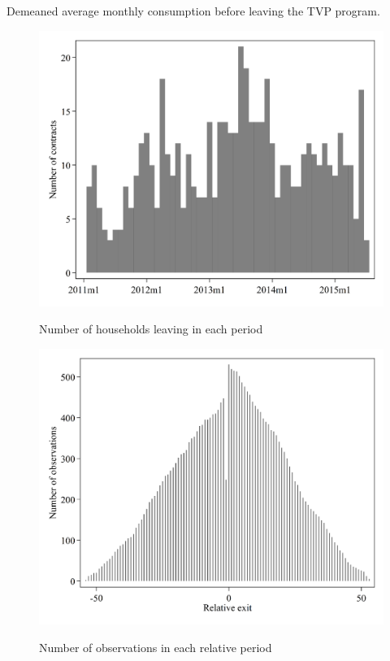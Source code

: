 Demeaned average monthly consumption before leaving the TVP program.\par

\FloatBarrier

\begin{figure}[ht]
  \caption{Number of households leaving in each period}\label{fig:thirteen}
  \begin{center}
  {\includegraphics[width=1\textwidth]{./figures/image13.png}}
  \end{center}
\end{figure}

\FloatBarrier

\begin{figure}[ht]
  \caption{Number of observations in each relative period}\label{fig:fourteen}
  \begin{center}
  {\includegraphics[width=1\textwidth]{./figures/image14.png}}
  \end{center}
\end{figure}

